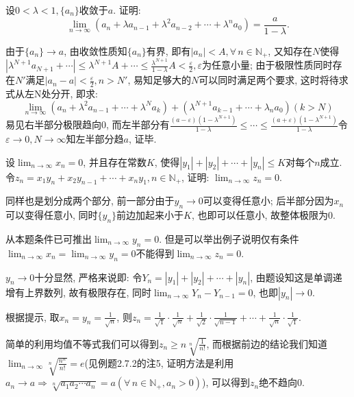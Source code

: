      \begin{exercise}
         设$0<\lambda<1,\{a_n\}$收敛于$a$. 证明:
         \[
             \lim_{n\to\infty}(a_n+\lambda a_{n-1}+{\lambda}^2 a_{n-2}+\cdots+{\lambda}^n a_0)=\frac{a}{1-\lambda}.
         \]
     \end{exercise}
     \begin{solution}
         由于$\{a_n\}\to a$, 由收敛性质知$\{a_n\}$有界, 即有$|a_n|<A, \forall\, n\in \mathbb{N}_+$, 又知存在$N$使得$|\lambda^{N+1}a_{N+1}+\cdots|\leqslant \lambda^{N+1}A+\cdots \leqslant \frac{\lambda^{N+1}}{1-\lambda}A<\frac{\varepsilon}{2},\varepsilon$为任意小量; 由于极限性质同时存在$N'$满足$|a_n-a|<\frac{\varepsilon}{2}, n>N'$, 易知足够大的$N$可以同时满足两个要求, 这时将待求式从左N处分开, 即求:
         \[
             \lim_{n\to\infty}(a_n+\lambda^2 a_{n-1}+\cdots+\lambda^N a_k)+(\lambda^{N+1}a_{k-1}+\cdots+\lambda_n a_0)(k>N)
         \]
         易见右半部分极限趋向0, 而左半部分有$\frac{(a-\varepsilon)(1-\lambda^{N+1})}{1-\lambda}\leqslant \cdots \leqslant \frac{(a+\varepsilon)(1-\lambda^{N+1})}{1-\lambda}$令$\varepsilon\to 0, N\to\infty$知左半部分趋$a$, 证毕.
     \end{solution}

     \begin{exercise}
         设$\lim_{n\to\infty}x_n=0$, 并且存在常数$K$, 使得$|y_1|+|y_2|+\cdots+|y_n|\leqslant K$对每个$n$成立. 令$z_n=x_1y_n+x_2y_{n-1}+\cdots+x_ny_1, n\in \mathbb{N}_+$, 证明: $\lim_{n\to\infty}z_n=0$.
     \end{exercise}
     \begin{solution}
         同样也是划分成两个部分, 前一部分由于$y_n\to 0$可以变得任意小; 后半部分因为$x_n$可以变得任意小, 同时$\{y_n\}$前边加起来小于$K$, 也即可以任意小, 故整体极限为0.
     \end{solution}
     \begin{note}
         从本题条件已可推出$\lim_{n\to\infty}y_n=0$. 但是可以举出例子说明仅有条件$\lim_{n\to\infty}x_n=\lim_{n\to\infty}y_n=0$不能得到$\lim_{n\to\infty}z_n=0$.
     \end{note}
     \begin{note}
         $y_n\to 0$十分显然, 严格来说即: 令$Y_n=|y_1|+|y_2|+\cdots+|y_n|$, 由题设知这是单调递增有上界数列, 故有极限存在, 同时$\lim_{n\to\infty}Y_n-Y_{n-1}=0$, 也即$|y_n|\to 0$.

         根据提示, 取$x_n=y_n=\frac{1}{\sqrt{n}}$, 则$z_n=\frac{1}{\sqrt{1}}\cdot\frac{1}{\sqrt{n}}+\frac{1}{\sqrt{2}}\cdot\frac{1}{\sqrt{n-1}}+\cdots+\frac{1}{\sqrt{n}}\cdot\frac{1}{\sqrt{1}}$.

         简单的利用均值不等式我们可以得到$z_n \geqslant n\sqrt[n]{\frac{1}{n!}}$, 而根据前边的结论我们知道$\lim_{n\to\infty}\sqrt[n]{\frac{n^n}{n!}}=e$(见例题2.7.2的注5, 证明方法是利用$a_n\to a \Rightarrow \sqrt[n]{a_1a_2\cdots a_n}=a(\forall\, n \in \mathbb{N}_+, a_n>0)$), 可以得到$z_n$绝不趋向0.
     \end{note}


